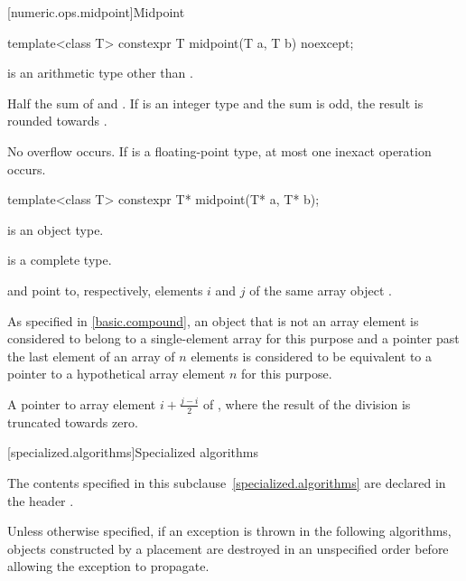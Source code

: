 [numeric.ops.midpoint]{Midpoint}

%
\begin{itemdecl}
template<class T>
  constexpr T midpoint(T a, T b) noexcept;
\end{itemdecl}
\begin{itemdescr}
\pnum
\constraints
{} is an arithmetic type other than .

\pnum
\returns
Half the sum of  and .
If  is an integer type and the sum is odd,
the result is rounded towards .

\pnum
\remarks
No overflow occurs.
If  is a floating-point type, at most one inexact operation occurs.
\end{itemdescr}

%
\begin{itemdecl}
template<class T>
  constexpr T* midpoint(T* a, T* b);
\end{itemdecl}
\begin{itemdescr}
\pnum
\constraints
{} is an object type.

\pnum
\mandates
{} is a complete type.

\pnum
\expects
{} and  point to, respectively,
elements $i$ and $j$ of the same array object .
\begin{note}
As specified in \ref{basic.compound},
an object that is not an array element
is considered to belong to a single-element array for this purpose and
a pointer past the last element of an array of $n$ elements
is considered to be equivalent to a pointer
to a hypothetical array element $n$ for this purpose.
\end{note}

\pnum
\returns
A pointer to array element $i+\frac{j-i}{2}$ of ,
where the result of the division is truncated towards zero.
\end{itemdescr}

[specialized.algorithms]{Specialized  algorithms}

\pnum
The contents specified in this subclause~\ref{specialized.algorithms}
are declared in the header .

\pnum
Unless otherwise specified,
if an exception is thrown in the following algorithms,
objects constructed by a placement 
are destroyed in an unspecified order
before allowing the exception to propagate.

